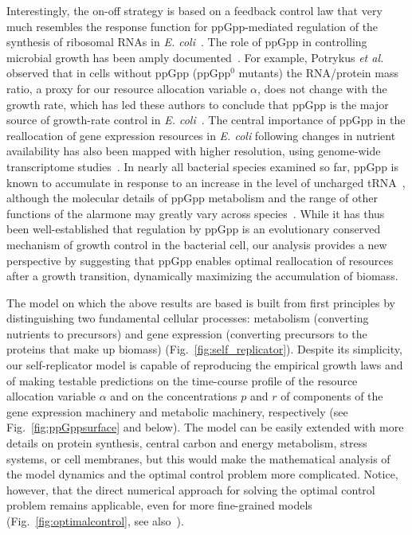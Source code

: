 Interestingly, the on-off strategy is based on a feedback control law that very much resembles the response function for ppGpp-mediated regulation of the synthesis of ribosomal RNAs in \textit{E. coli}~\cite{bosdriesz_how_2015}.
The role of ppGpp in controlling microbial growth has been amply documented~\cite{dalebroux_ppgpp_2012,potrykus_pppgpp_2008,hauryliuk_recent_2015}.
For example, Potrykus \textit{et al.} observed that in cells without ppGpp (ppGpp$^0$ mutants) the RNA/protein mass ratio, a proxy for our resource allocation variable $\alpha$, does not change with the growth rate, which has led these authors to conclude that ppGpp is the major source of growth-rate control in \textit{E. coli}~\cite{potrykus_ppgpp_2011}.
The central importance of ppGpp in the reallocation of gene expression resources in \textit{E. coli} following changes in nutrient availability has also been mapped with higher resolution, using genome-wide transcriptome studies~\cite{traxler_guanosine_2006,traxler_global_2008}.
In nearly all bacterial species examined so far, ppGpp is known to accumulate in response to an increase in the level of uncharged tRNA~\cite{gaca_many_2015}, although the molecular details of ppGpp metabolism and the range of other functions of the alarmone may greatly vary across species~\cite{gaca_many_2015,hauryliuk_recent_2015,liu_diversity_2015}.
While it has thus been well-established that regulation by ppGpp is an evolutionary conserved mechanism of growth control in the bacterial cell, our analysis provides a new perspective by suggesting that ppGpp enables optimal reallocation of resources after a growth transition, dynamically maximizing the accumulation of biomass.

The model on which the above results are based is built from first principles by distinguishing two fundamental cellular processes: metabolism (converting nutrients to precursors) and gene expression (converting precursors to the proteins that make up biomass) (Fig.~\ref{fig:self_replicator}). 
Despite its simplicity, our self-replicator model is capable of reproducing the empirical growth laws and of making testable predictions on the time-course profile of the resource allocation variable $\alpha$ and on the concentrations $p$ and $r$ of components of the gene expression machinery and metabolic machinery, respectively (see Fig.~\ref{fig:ppGppsurface} and below). 
The model can be easily extended with more details on protein synthesis, central carbon and energy metabolism, stress systems, or cell membranes, but this would make the mathematical analysis of the model dynamics and the optimal control problem more complicated. 
Notice, however, that the direct numerical approach for solving the optimal control problem remains applicable, even for more fine-grained models (Fig.~\ref{fig:optimalcontrol}, see also~\cite{waldherr_dynamic_2015}).

